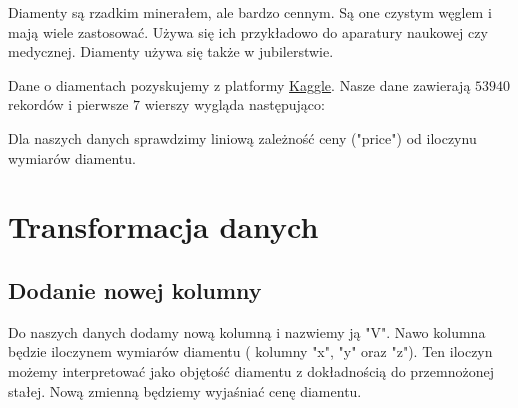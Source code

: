 \documentclass[12pt,leqno]{article}
\theoremstyle{exer}
\begin{document}
	Diamenty są rzadkim minerałem, ale bardzo cennym. Są one czystym węglem i mają wiele zastosować. Używa się ich przykładowo do aparatury naukowej czy medycznej. Diamenty używa się także w jubilerstwie.
	
	Dane o diamentach pozyskujemy z platformy \href{https://www.kaggle.com}{Kaggle}. Nasze dane zawierają $53940$ rekordów i pierwsze $7$ wierszy wygląda następująco:
	\begin{table}[H]
		\caption{Oryginalne dane }
		\label{orginalne_dane}
	\end{table}
	
	Dla naszych danych sprawdzimy liniową zależność ceny ("price") od iloczynu wymiarów diamentu.
	\section{Transformacja danych}
	
	\subsection{Dodanie nowej kolumny }
	Do naszych danych dodamy nową kolumną i nazwiemy ją "V". Nawo kolumna będzie iloczynem wymiarów diamentu ( kolumny "x", "y" oraz "z"). Ten iloczyn możemy interpretować jako objętość diamentu z dokładnością do przemnożonej stałej. Nową zmienną będziemy wyjaśniać cenę diamentu.
	
\end{document}
